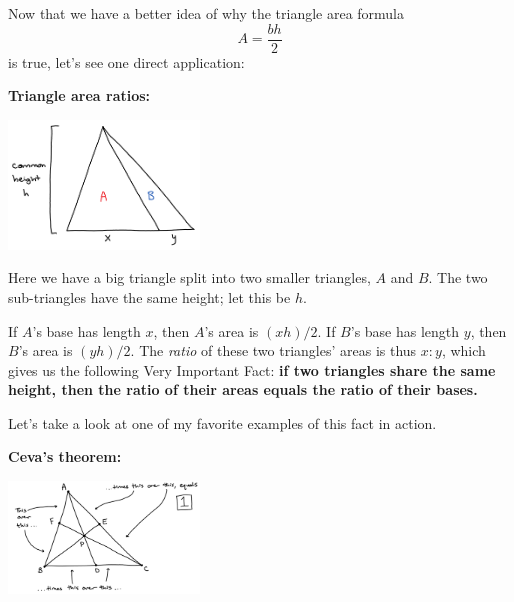\documentclass{article}
\begin{document}
Now that we have a better idea of why the triangle area formula
\[ A = \frac{bh}{2} \]
is true, let's see one direct application:

\textbf{Triangle area ratios:}

\begin{center}
    \centering
    \includegraphics[width=2in]{images/triangle_areas/part_2/common_height.png}
\end{center}

Here we have a big triangle split into two smaller triangles, $A$ and $B$. The two sub-triangles have the same height; let this be $h$.

If $A$'s base has length $x$, then $A$'s area is $(xh)/2$. If $B$'s base has length $y$, then $B$'s area is $(yh)/2$. The \textit{ratio} of these two triangles' areas is thus $x : y$, which gives us the following Very Important Fact: \textbf{if two triangles share the same height, then the ratio of their areas equals the ratio of their bases.}

Let's take a look at one of my favorite examples of this fact in action.

\textbf{Ceva's theorem:}

\begin{center}
    \centering
    \includegraphics[width=2in]{images/triangle_areas/part_2/ceva_fig0.png}
\end{center}
\end{document}
